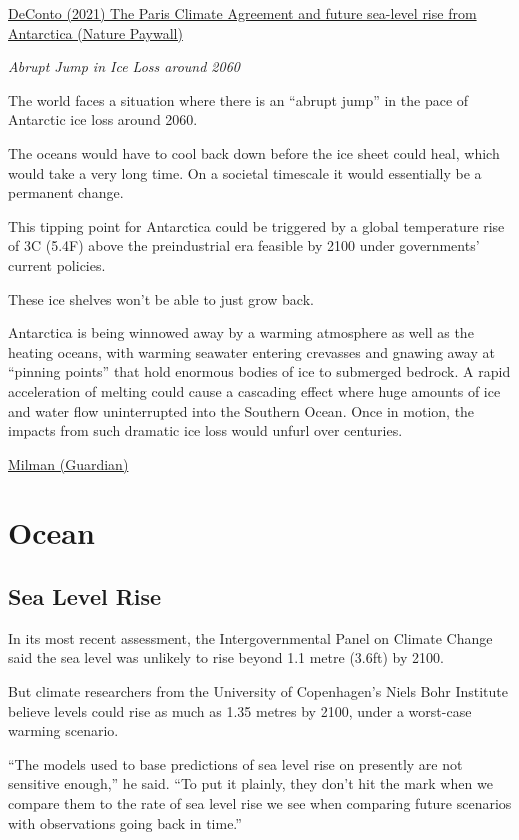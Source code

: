 \documentclass[
]{book}
\begin{document}
\href{https://www.nature.com/articles/s41586-021-03427-0}{DeConto (2021) The Paris Climate Agreement and future sea-level rise from Antarctica (Nature Paywall)}

\emph{Abrupt Jump in Ice Loss around 2060}

The world faces a situation where there is an ``abrupt jump'' in the pace of Antarctic ice loss around 2060.

The oceans would have to cool back down before the ice sheet could heal, which would take a very long time. On a societal timescale it would essentially be a permanent change.

This tipping point for Antarctica could be triggered by a global temperature rise of 3C (5.4F) above the preindustrial era feasible by 2100 under governments' current policies.

These ice shelves won't be able to just grow back.

Antarctica is being winnowed away by a warming atmosphere as well as the heating oceans, with warming seawater entering crevasses and gnawing away at ``pinning points'' that hold enormous bodies of ice to submerged bedrock. A rapid acceleration of melting could cause a cascading effect where huge amounts of ice and water flow uninterrupted into the Southern Ocean.
Once in motion, the impacts from such dramatic ice loss would unfurl over centuries.

\href{https://www.theguardian.com/environment/2021/may/05/antarctica-ice-sheet-melting-global-heating-sea-level-rise-study}{Milman (Guardian)}

\hypertarget{ocean}{%
\chapter{Ocean}\label{ocean}}

\hypertarget{sea-level-rise}{%
\section{Sea Level Rise}\label{sea-level-rise}}

In its most recent assessment, the Intergovernmental Panel on Climate Change said the sea level was unlikely to rise beyond 1.1 metre (3.6ft) by 2100.

But climate researchers from the University of Copenhagen's Niels Bohr Institute believe levels could rise as much as 1.35 metres by 2100, under a worst-case warming scenario.

``The models used to base predictions of sea level rise on presently are not sensitive enough,'' he said. ``To put it plainly, they don't hit the mark when we compare them to the rate of sea level rise we see when comparing future scenarios with observations going back in time.''
\end{document}

